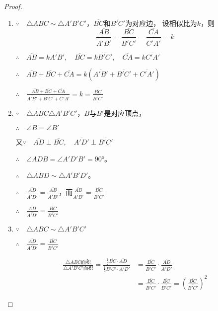 \begin{proof}
\begin{enumerate}
    \item $\because\quad \triangle ABC\sim \triangle A'B'C'$，$\overline{BC}$和$\overline{B'C'}$为对应边，
    设相似比为$k$，则
\[\frac{\overline{AB}}{\overline{A'B'}}=\frac{\overline{BC}}{\overline{B'C'}}=\frac{\overline{CA}}{\overline{C'A'}}=k\]

$\therefore\quad \overline{AB}=k\overline{A'B'},\quad  \overline{BC}=k\overline{B'C'},\quad \overline{CA}= k\overline{C'A'}$

$\therefore\quad \overline{AB}+\overline{BC}+\overline{CA}=k\left(\overline{A'B'}+\overline{B'C'}+\overline{C'A'}\right)$

$\therefore\quad \frac{\overline{AB} + \overline{BC} +\overline{CA}}{\overline{A'B'} + \overline{B'C'} +\overline{C'A'}}=k=\frac{\overline{BC}}{\overline{B'C'}}$

\item $\because\quad \triangle ABC\triangle A'B'C'$，$B$与$B'$是对应顶点，

$\therefore\quad \angle B=\angle B'$

    又$\because\quad \overline{AD}\perp \overline{BC},\quad \overline{A'D'}\perp \overline{B'C'}$

$\therefore\quad \angle ADB=\angle A'D'B'=\ang{90}$。

$\therefore\quad \triangle ABD\sim \triangle A'B'D'$。

$\therefore\quad \frac{\overline{AD}}{\overline{A'D'}}=\frac{\overline{AB}}{\overline{A'B'}}$，而$\frac{\overline{AB}}{\overline{A'B'}}=\frac{\overline{BC}}{\overline{B'C'}}$

$\therefore\quad \frac{\overline{AD}}{\overline{A'D'}}=\frac{\overline{BC}}{\overline{B'C'}}$

\item $\because\quad \triangle ABC\sim \triangle A'B'C'$

$\therefore\quad \frac{\overline{AD}}{\overline{A'D'}}=\frac{\overline{BC}}{\overline{B'C'}}$

\[\begin{split}
\frac{\triangle ABC\text{面积}}{\triangle A'B'C'\text{面积}}
=\frac{\frac{1}{2}\overline{BC}\cdot \overline{AD}}{\frac{1}{2}\overline{B'C'}\cdot \overline{A'D'}}&=\frac{\overline{BC} }{\overline{B'C'}}\cdot\frac{\overline{AD}}{\overline{A'D'}}\\
&=\frac{\overline{BC} }{\overline{B'C'}}\cdot\frac{\overline{BC} }{\overline{B'C'}}=\left(\frac{\overline{BC}}{\overline{B'C'}}\right)^2    
\end{split}\]
\end{enumerate}
\end{proof}


